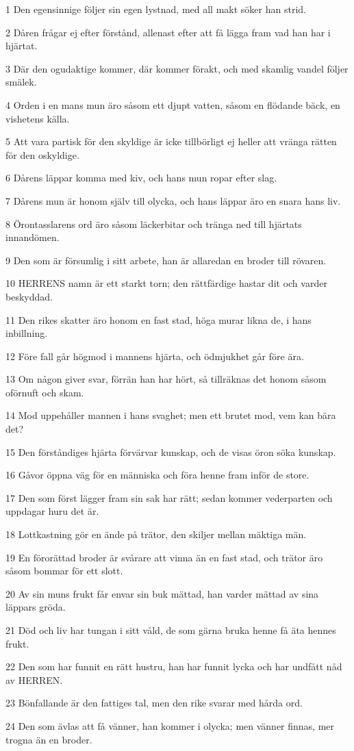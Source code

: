 \par 1 Den egensinnige följer sin egen lystnad, med all makt söker han strid.
\par 2 Dåren frågar ej efter förstånd, allenast efter att få lägga fram vad han har i hjärtat.
\par 3 Där den ogudaktige kommer, där kommer förakt, och med skamlig vandel följer smälek.
\par 4 Orden i en mans mun äro såsom ett djupt vatten, såsom en flödande bäck, en vishetens källa.
\par 5 Att vara partisk för den skyldige är icke tillbörligt ej heller att vränga rätten för den oskyldige.
\par 6 Dårens läppar komma med kiv, och hans mun ropar efter slag.
\par 7 Dårens mun är honom själv till olycka, och hans läppar äro en snara hans liv.
\par 8 Örontasslarens ord äro såsom läckerbitar och tränga ned till hjärtats innandömen.
\par 9 Den som är försumlig i sitt arbete, han är allaredan en broder till rövaren.
\par 10 HERRENS namn är ett starkt torn; den rättfärdige hastar dit och varder beskyddad.
\par 11 Den rikes skatter äro honom en fast stad, höga murar likna de, i hans inbillning.
\par 12 Före fall går högmod i mannens hjärta, och ödmjukhet går före ära.
\par 13 Om någon giver svar, förrän han har hört, så tillräknas det honom såsom oförnuft och skam.
\par 14 Mod uppehåller mannen i hans svaghet; men ett brutet mod, vem kan bära det?
\par 15 Den förståndiges hjärta förvärvar kunskap, och de visas öron söka kunskap.
\par 16 Gåvor öppna väg för en människa och föra henne fram inför de store.
\par 17 Den som först lägger fram sin sak har rätt; sedan kommer vederparten och uppdagar huru det är.
\par 18 Lottkastning gör en ände på trätor, den skiljer mellan mäktiga män.
\par 19 En förorättad broder är svårare att vinna än en fast stad, och trätor äro såsom bommar för ett slott.
\par 20 Av sin muns frukt får envar sin buk mättad, han varder mättad av sina läppars gröda.
\par 21 Död och liv har tungan i sitt våld, de som gärna bruka henne få äta hennes frukt.
\par 22 Den som har funnit en rätt hustru, han har funnit lycka och har undfått nåd av HERREN.
\par 23 Bönfallande är den fattiges tal, men den rike svarar med hårda ord.
\par 24 Den som ävlas att få vänner, han kommer i olycka; men vänner finnas, mer trogna än en broder.

